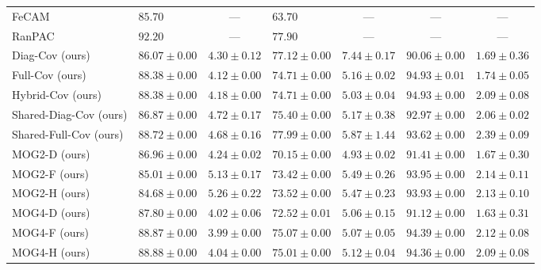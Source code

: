 \begin{table}[htb]
\begin{tabularx}{\textwidth}{lXXXXXX}
		FeCAM \cite{goswami2024fecam}           & $85.70$ & \multicolumn{1}{c}{---} & $63.70$ & \multicolumn{1}{c}{---} & \multicolumn{1}{c}{---} & \multicolumn{1}{c}{---} \\
		RanPAC \cite{mcdonnell2023ranpac}       & $\mathbf{92.20}$ & \multicolumn{1}{c}{---} & $77.90$ & \multicolumn{1}{c}{---} & \multicolumn{1}{c}{---} & \multicolumn{1}{c}{---} \\
		\midrule
		\rowcolor{gray!15} Diag-Cov (ours)         & $86.07 \pm 0.00$ & $4.30 \pm 0.12$ & $77.12 \pm 0.00$ & $7.44 \pm 0.17$ & $90.06 \pm 0.00$ & $1.69 \pm 0.36$ \\
		\rowcolor{gray!15} Full-Cov (ours)         & $88.38 \pm 0.00$ & $4.12 \pm 0.00$ & $74.71 \pm 0.00$ & $5.16 \pm 0.02$ & $94.93 \pm 0.01$ & $1.74 \pm 0.05$ \\
		\rowcolor{gray!15} Hybrid-Cov (ours)       & $88.38 \pm 0.00$ & $4.18 \pm 0.00$ & $74.71 \pm 0.00$ & $5.03 \pm 0.04$ & $94.93 \pm 0.00$ & $2.09 \pm 0.08$ \\
		\rowcolor{gray!15} Shared-Diag-Cov (ours)  & $86.87 \pm 0.00$ & $4.72 \pm 0.17$ & $75.40 \pm 0.00$ & $5.17 \pm 0.38$ & $92.97 \pm 0.00$ & $2.06 \pm 0.02$ \\
		\rowcolor{gray!15} Shared-Full-Cov (ours)  & $88.72 \pm 0.00$ & $4.68 \pm 0.16$ & $77.99 \pm 0.00$ & $5.87 \pm 1.44$ & $93.62 \pm 0.00$ & $2.39 \pm 0.09$ \\
		\rowcolor{gray!15} MOG2-D (ours)           & $86.96 \pm 0.00$ & $4.24 \pm 0.02$ & $70.15 \pm 0.00$ & $4.93 \pm 0.02$ & $91.41 \pm 0.00$ & $1.67 \pm 0.30$ \\
		\rowcolor{gray!15} MOG2-F (ours)           & $85.01 \pm 0.00$ & $5.13 \pm 0.17$ & $73.42 \pm 0.00$ & $5.49 \pm 0.26$ & $93.95 \pm 0.00$ & $2.14 \pm 0.11$ \\
		\rowcolor{gray!15} MOG2-H (ours)           & $84.68 \pm 0.00$ & $5.26 \pm 0.22$ & $73.52 \pm 0.00$ & $5.47 \pm 0.23$ & $93.93 \pm 0.00$ & $2.13 \pm 0.10$ \\
		\rowcolor{gray!15} MOG4-D (ours)           & $87.80 \pm 0.00$ & $4.02 \pm 0.06$ & $72.52 \pm 0.01$ & $5.06 \pm 0.15$ & $91.12 \pm 0.00$ & $1.63 \pm 0.31$ \\
		\rowcolor{gray!15} MOG4-F (ours)           & $88.87 \pm 0.00$ & $3.99 \pm 0.00$ & $75.07 \pm 0.00$ & $5.07 \pm 0.05$ & $94.39 \pm 0.00$ & $2.12 \pm 0.08$ \\
		\rowcolor{gray!15} MOG4-H (ours)           & $88.88 \pm 0.00$ & $4.04 \pm 0.00$ & $75.01 \pm 0.00$ & $5.12 \pm 0.04$ & $94.36 \pm 0.00$ & $2.09 \pm 0.08$ \\

\end{tabularx}
\end{table}
